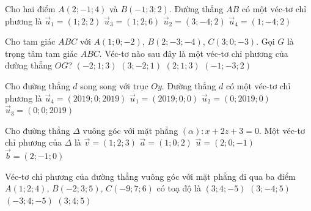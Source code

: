 \begin{ex}%
	Cho hai điểm $A(2;-1;4)$ và $B(-1;3;2)$. Đường thẳng $AB$ có một véc-tơ chỉ phương là
	\choice
	{$\overrightarrow{u}_1=(1;2;2)$}
	{$\overrightarrow{u}_3=(1;2;6)$}
	{\True $\overrightarrow{u}_2=(3;-4;2)$}
	{$\overrightarrow{u}_4=(1;-4;2)$}
\end{ex}
\begin{ex}%
	Cho tam giác $ABC$ với $A(1;0;-2)$, $B(2;-3;-4)$, $C(3;0;-3)$. Gọi $G$ là trọng tâm tam giác $ABC$. Véc-tơ nào sau đây là một véc-tơ chỉ phương của đường thẳng $OG$?
	\choice
	{\True $(-2;1;3)$}
	{$(3;-2;1)$}
	{$(2;1;3)$}
	{$(-1;-3;2)$}
\end{ex}
\begin{ex}
	Cho đường thẳng $d$ song song với trục $Oy$. Đường thẳng $d$ có một véc-tơ chỉ phương là
	\choice
	{$\overrightarrow{u}_4=(2019;0;2019)$}
	{$\overrightarrow{u}_1=(2019;0;0)$}
	{\True $\overrightarrow{u}_2=(0;2019;0)$}
	{$\overrightarrow{u}_3=(0;0;2019)$}
\end{ex}
\begin{ex}%
	Cho đường thẳng $\Delta$ vuông góc với mặt phẳng $(\alpha) \colon x+2z+3=0$. Một véc-tơ chỉ phương của $\Delta$ là
	\choice
	{$\overrightarrow{v}=(1;2;3)$}
	{\True $\overrightarrow{a}=(1;0;2)$}
	{$\overrightarrow{u}=(2;0;-1)$}
	{$\overrightarrow{b}=(2;-1;0)$}
\end{ex}
\begin{ex}%
	Véc-tơ chỉ phương của đường thẳng vuông góc với mặt phẳng đi qua ba điểm $A(1;2;4)$, $B(-2;3;5)$, $C(-9;7;6)$ có toạ độ là
	\choice
	{$(3;4;-5)$}
	{$(3;-4;5)$}
	{$(-3;4;-5)$}
	{\True $(3;4;5)$}
\end{ex}
